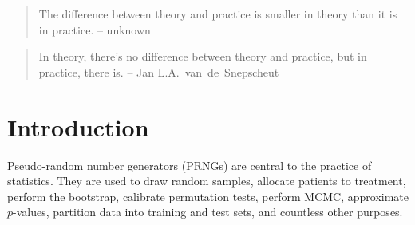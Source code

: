 \documentclass[graybox]{svmult}
\begin{document}
\begin{quotation}
The difference between theory and practice is smaller in theory than it is in practice. -- unknown
\end{quotation}


\begin{quotation}
In theory, there's no difference between theory and practice, but in practice, there is. -- Jan L.A.~van~de~Snepscheut
\end{quotation}

\section{Introduction}
\label{sec:introduction}

%
%
%

Pseudo-random number generators (PRNGs) are central to the practice of statistics.
They are used to draw random samples, allocate patients to treatment, perform the bootstrap, 
calibrate permutation tests, perform MCMC, approximate $p$-values, partition data into training and test sets, and countless other purposes.
\end{document}
